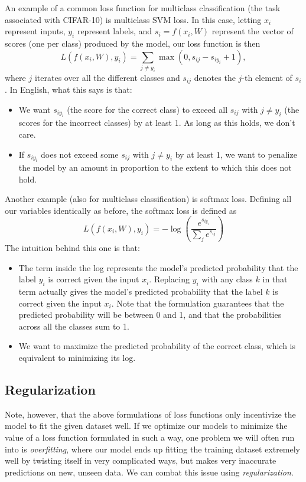 An example of a common loss function for multiclass classification (the task associated with CIFAR-10) is multiclass SVM loss. In this case, letting $x_i$ represent inputs, $y_i$ represent labels, and $s_i = f(x_i, W)$ represent the vector of scores (one per class) produced by the model, our loss function is then
$$L\left(f\left(x_i, W\right), y_i\right) = \sum_{j \ne y_i} \max\left(0, s_{ij} - s_{iy_i} + 1\right),$$
where $j$ iterates over all the different classes and $s_{ij}$ denotes the $j$-th element of $s_i$. In English, what this says is that:
\begin{itemize}
\item We want $s_{iy_i}$ (the score for the correct class) to exceed all $s_{ij}$ with $j\ne y_i$ (the scores for the incorrect classes) by at least 1. As long as this holds, we don't care.
\item If $s_{iy_i}$ does not exceed some $s_{ij}$ with $j\ne y_i$ by at least 1, we want to penalize the model by an amount in proportion to the extent to which this does not hold.
\end{itemize}
Another example (also for multiclass classification) is softmax loss. Defining all our variables identically as before, the softmax loss is defined as
$$L\left(f\left(x_i, W\right), y_i\right) = -\log\left(\frac{e^{s_{iy_i}}}{\sum_j e^{s_{ij}}}\right)$$
The intuition behind this one is that:
\begin{itemize}
\item The term inside the log represents the model's predicted probability that the label $y_i$ is correct given the input $x_i$. Replacing $y_i$ with any class $k$ in that term actually gives the model's predicted probability that the label $k$ is correct given the input $x_i$. Note that the formulation guarantees that the predicted probability will be between 0 and 1, and that the probabilities across all the classes sum to 1.
\item We want to maximize the predicted probability of the correct class, which is equivalent to minimizing its log.
\end{itemize}

\subsection{Regularization}
Note, however, that the above formulations of loss functions only incentivize the model to fit the given dataset well. If we optimize our models to minimize the value of a loss function formulated in such a way, one problem we will often run into is \emph{overfitting}, where our model ends up fitting the training dataset extremely well by twisting itself in very complicated ways, but makes very inaccurate predictions on new, unseen data. We can combat this issue using \emph{regularization}.

